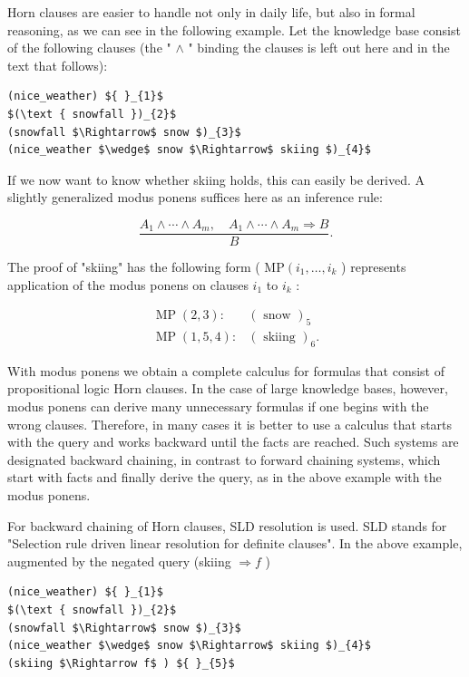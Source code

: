 \documentclass[10pt]{book}
\begin{document}
Horn clauses are easier to handle not only in daily life, but also in formal reasoning, as we can see in the following example. Let the knowledge base consist of the following clauses (the " $\wedge$ " binding the clauses is left out here and in the text that follows):

\begin{verbatim}
(nice_weather) ${ }_{1}$
$(\text { snowfall })_{2}$
(snowfall $\Rightarrow$ snow $)_{3}$
(nice_weather $\wedge$ snow $\Rightarrow$ skiing $)_{4}$
\end{verbatim}

If we now want to know whether skiing holds, this can easily be derived. A slightly generalized modus ponens suffices here as an inference rule:

$$
\frac{A_{1} \wedge \cdots \wedge A_{m}, \quad A_{1} \wedge \cdots \wedge A_{m} \Rightarrow B}{B} .
$$

The proof of "skiing" has the following form ( $\mathrm{MP}\left(i_{1}, \ldots, i_{k}\right.$ ) represents application of the modus ponens on clauses $i_{1}$ to $i_{k}$ :

$$
\begin{array}{ll}
\operatorname{MP}(2,3): & (\text { snow })_{5} \\
\operatorname{MP}(1,5,4): & (\text { skiing })_{6} .
\end{array}
$$

With modus ponens we obtain a complete calculus for formulas that consist of propositional logic Horn clauses. In the case of large knowledge bases, however, modus ponens can derive many unnecessary formulas if one begins with the wrong clauses. Therefore, in many cases it is better to use a calculus that starts with the query and works backward until the facts are reached. Such systems are designated backward chaining, in contrast to forward chaining systems, which start with facts and finally derive the query, as in the above example with the modus ponens.

For backward chaining of Horn clauses, SLD resolution is used. SLD stands for "Selection rule driven linear resolution for definite clauses". In the above example, augmented by the negated query (skiing $\Rightarrow f$ )

\begin{verbatim}
(nice_weather) ${ }_{1}$
$(\text { snowfall })_{2}$
(snowfall $\Rightarrow$ snow $)_{3}$
(nice_weather $\wedge$ snow $\Rightarrow$ skiing $)_{4}$
(skiing $\Rightarrow f$ ) ${ }_{5}$
\end{verbatim}
\end{document}
